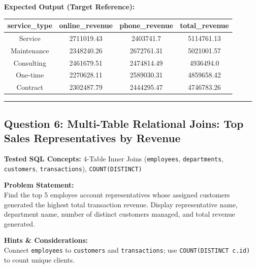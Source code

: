 \documentclass[11pt,a4paper]{article}
\begin{document}
\vspace{0.3cm}
\noindent\textbf{Expected Output (Target Reference):}
\begin{center}
\small
\begin{tabular}{cccc}
\toprule
\textbf{service\_type} & \textbf{online\_revenue} & \textbf{phone\_revenue} & \textbf{total\_revenue} \\
\midrule
Service & 2711019.43 & 2403741.7 & 5114761.13 \\
Maintenance & 2348240.26 & 2672761.31 & 5021001.57 \\
Consulting & 2461679.51 & 2474814.49 & 4936494.0 \\
One-time & 2270628.11 & 2589030.31 & 4859658.42 \\
Contract & 2302487.79 & 2444295.47 & 4746783.26 \\
\bottomrule
\end{tabular}
\end{center}

\vspace{0.4cm}
\noindent\rule{\textwidth}{0.4pt}
\vspace{0.4cm}

\subsection*{Question 6: Multi-Table Relational Joins: Top Sales Representatives by Revenue}

\noindent\textbf{Tested SQL Concepts:} 4-Table Inner Joins (\texttt{employees}, \texttt{departments}, \texttt{customers}, \texttt{transactions}), \texttt{COUNT(DISTINCT)}

\vspace{0.15cm}
\noindent\textbf{Problem Statement:} \\
Find the top 5 employee account representatives whose assigned customers generated the highest total transaction revenue. Display representative name, department name, number of distinct customers managed, and total revenue generated.

\vspace{0.2cm}
\noindent\textbf{Hints \& Considerations:} \\
Connect \texttt{employees} to \texttt{customers} and \texttt{transactions}; use \texttt{COUNT(DISTINCT c.id)} to count unique clients.
\end{document}
